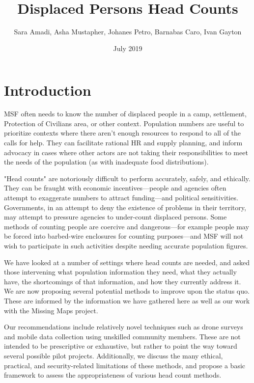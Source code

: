 \documentclass[a4paper,12pt,twoside]{article}
\title{Displaced Persons Head Counts}
\author{Sara Amadi, Asha Mustapher, Johanes Petro, Barnabas Caro, Ivan Gayton }
\date{July 2019}
\begin{document}
\maketitle


\renewcommand{\baselinestretch}{1.5}\normalsize %
\tableofcontents
\renewcommand{\baselinestretch}{1.0}\normalsize

\newpage

\section{Introduction}
\begin{multicols}{2}
MSF often needs to know the number of displaced people in a camp, settlement, Protection of Civilians area, or other context. Population numbers are useful to prioritize contexts where there aren't enough resources to respond to all of the calls for help. They can facilitate rational HR and supply planning, and inform advocacy in cases where other actors are not taking their responsibilities to meet the needs of the population (as with inadequate food distributions). 

"Head counts" are notoriously difficult to perform accurately, safely, and ethically. They can be fraught with economic incentives---people and agencies often attempt to exaggerate numbers to attract funding---and political sensitivities. Governments, in an attempt to deny the existence of problems in their territory, may attempt to pressure agencies to under-count displaced persons. Some methods of counting people are coercive and dangerous---for example people may be forced into barbed-wire enclosures for counting purposes---and MSF will not wish to participate in such activities despite needing accurate population figures. 

We have looked at a number of settings where head counts are needed, and asked those intervening what population information they need, what they actually have, the shortcomings of that information, and how they currently address it. We are now proposing several potential methods to improve upon the status quo. These are informed by the information we have gathered here as well as our work with the Missing Maps project.

Our recommendations include relatively novel techniques such as drone surveys and mobile data collection using unskilled community members. These are not intended to be prescriptive or exhaustive, but rather to point the way toward several possible pilot projects. Additionally, we discuss the many ethical, practical, and security-related limitations of these methods, and propose a basic framework to assess the appropriateness of various head count methods.

\end{multicols}
\end{document}
